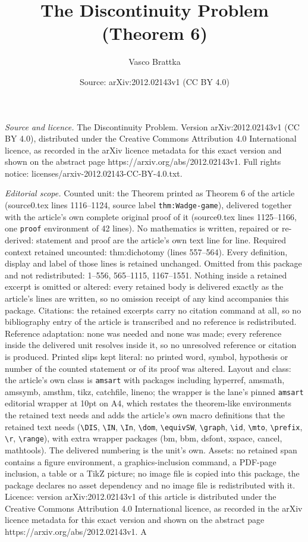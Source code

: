 \documentclass[10pt,a4paper]{amsart}
\title[The Discontinuity Problem]{The Discontinuity Problem (Theorem 6)}
\author{Vasco Brattka}
\date{Source: arXiv:2012.02143v1 (CC BY 4.0)}
\begin{document}
\maketitle

\noindent\emph{Source and licence.} The Discontinuity Problem. Version arXiv:2012.02143v1 (CC BY 4.0), distributed under the Creative Commons Attribution 4.0 International licence, as recorded in the arXiv licence metadata for this exact version and shown on the abstract page https://arxiv.org/abs/2012.02143v1. Full rights notice: licenses/arxiv-2012.02143-CC-BY-4.0.txt.\par\smallskip

\noindent\textit{Editorial scope.} Counted unit: the Theorem printed as Theorem 6 of the article (source0.tex lines 1116--1124, source label \texttt{thm:Wadge-game}), delivered together with the article's own complete original proof of it (source0.tex lines 1125--1166, one \texttt{proof} environment of 42 lines). No mathematics is written, repaired or re-derived: statement and proof are the article's own text line for line. Required context retained uncounted: thm:dichotomy (lines 557--564). Every definition, display and label of those lines is retained unchanged. Omitted from this package and not redistributed: 1--556, 565--1115, 1167--1551. Nothing inside a retained excerpt is omitted or altered: every retained body is delivered exactly as the article's lines are written, so no omission receipt of any kind accompanies this package. Citations: the retained excerpts carry no citation command at all, so no bibliography entry of the article is transcribed and no reference is redistributed. Reference adaptation: none was needed and none was made; every reference inside the delivered unit resolves inside it, so no unresolved reference or citation is produced. Printed slips kept literal: no printed word, symbol, hypothesis or number of the counted statement or of its proof was altered. Layout and class: the article's own class is \texttt{amsart} with packages including hyperref, amsmath, amssymb, amsthm, tikz, catchfile, lineno; the wrapper is the lane's pinned \texttt{amsart} editorial wrapper at 10pt on A4, which restates the theorem-like environments the retained text needs and adds the article's own macro definitions that the retained text needs (\texttt{\textbackslash DIS}, \texttt{\textbackslash IN}, \texttt{\textbackslash In}, \texttt{\textbackslash dom}, \texttt{\textbackslash equivSW}, \texttt{\textbackslash graph}, \texttt{\textbackslash id}, \texttt{\textbackslash mto}, \texttt{\textbackslash prefix}, \texttt{\textbackslash r}, \texttt{\textbackslash range}), with extra wrapper packages (bm, bbm, dsfont, xspace, cancel, mathtools). The delivered numbering is the unit's own. Assets: no retained span contains a figure environment, a graphics-inclusion command, a PDF-page inclusion, a table or a TikZ picture; no image file is copied into this package, the package declares no asset dependency and no image file is redistributed with it. Licence: version arXiv:2012.02143v1 of this article is distributed under the Creative Commons Attribution 4.0 International licence, as recorded in the arXiv licence metadata for this exact version and shown on the abstract page https://arxiv.org/abs/2012.02143v1. A 
\end{document}
